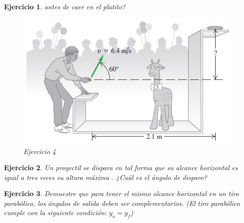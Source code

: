 \documentclass[11pt, spanish, letterpage]{article} %
\theoremstyle{Tema} \newtheorem{Tema}{Tema} %
\theoremstyle{Tema} \newtheorem{serie}{Serie}              %
\theoremstyle{Tema} \newtheorem{ejercicio}{Ejercicio}    %
\theoremstyle{Tema} \newtheorem{preguntas}{Preguntas}    %
\begin{document}
\begin{titlepage}
\begin{mdframed}[style=warning]
\begin{ejercicio}
        antes de caer en el platito?
        \begin{figure}[H]
            \centering
            \includegraphics[scale=0.6]{JIRAFA.PNG}
            \caption{Ejercicio 4}
            \label{JIRAFA}
        \end{figure}
    \end{ejercicio}
\end{mdframed}
\begin{mdframed}[style=warning] %
    \begin{ejercicio}
        Un proyectil se dispara en tal forma que su alcance horizontal es igual a tres veces su altura máxima . ¿Cuál es el ángulo de disparo?
    \end{ejercicio}
\end{mdframed}
\begin{mdframed}[style=warning] %
    \begin{ejercicio}
        Demuestre que para tener el mismo alcance horizontal en un tiro parabólico, los ángulos de salida deben ser complementarios. (El tiro parabólico cumple con la siguiente condición: $y_o = y_f$)
    \end{ejercicio}
\end{mdframed}



\end{titlepage}
\end{document}
